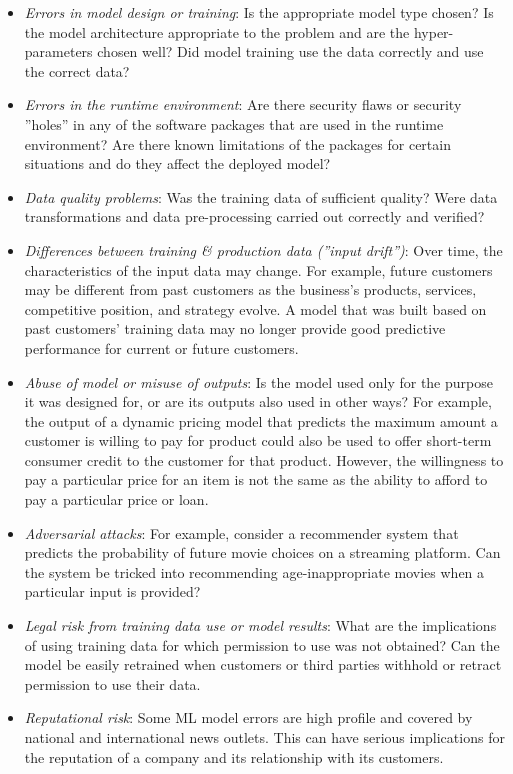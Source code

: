 \begin{itemize}
   \item \emph{Errors in model design or training}: Is the appropriate model type chosen? Is the model architecture appropriate to the problem and are the hyper-parameters chosen well? Did model training use the data correctly and use the correct data?
   \item \emph{Errors in the runtime environment}: Are there security flaws or security ''holes'' in any of the software packages that are used in the runtime environment? Are there known limitations of the packages for certain situations and do they affect the deployed model?
   \item \emph{Data quality problems}: Was the training data of sufficient quality? Were data transformations and data pre-processing carried out correctly and verified?
   \item \emph{Differences between training \& production data (''input drift'')}: Over time, the characteristics of the input data may change. For example, future customers may be different from past customers as the business's products, services, competitive position, and strategy evolve. A model that was built based on past customers' training data may no longer provide good predictive performance for current or future customers. 
   \item \emph{Abuse of model or misuse of outputs}: Is the model used only for the purpose it was designed for, or are its outputs also used in other ways? For example, the output of a dynamic pricing model that predicts the maximum amount a customer is willing to pay for product could also be used to offer short-term consumer credit to the customer for that product. However, the willingness to pay a particular price for an item is not the same as the ability to afford to pay a particular price or loan.
   \item \emph{Adversarial attacks}: For example, consider a recommender system that predicts the probability of future movie choices on a streaming platform. Can the system be tricked into recommending age-inappropriate movies when a particular input is provided?
   \item \emph{Legal risk from training data use or model results}: What are the implications of using training data for which permission to use was not obtained? Can the model be easily retrained when customers or third parties withhold or retract permission to use their data.
   \item \emph{Reputational risk}: Some ML model errors are high profile and covered by national and international news outlets. This can have serious implications for the reputation of a company and its relationship with its customers. 
\end{itemize}

